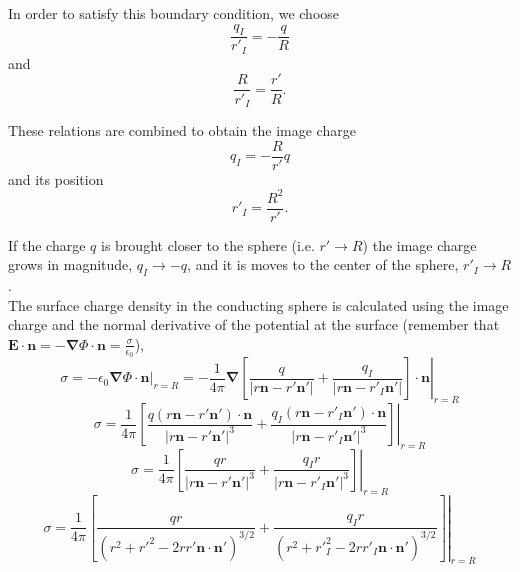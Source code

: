 In order to satisfy this boundary condition, we choose
\begin{equation}
\frac{q_I}{r'_I} = -\frac{q}{R} 
\end{equation}
and
\begin{equation}
\frac{R}{r'_I} = \frac{r'}{R}.
\end{equation}

These relations are combined to obtain the image charge
\begin{equation}
 q_I = -\frac{R}{r'} q \label{ImageCharge01}
 \end{equation}
and its position
\begin{equation}
r'_I = \frac{R^2}{r'}.  \label{ImageChargePosition01}
\end{equation}

If the charge $q$ is brought closer to the sphere (i.e. $r' \rightarrow R$) the image charge grows in magnitude, $q_I \rightarrow -q$, and it is moves to the center of the sphere, $r'_I \rightarrow R$. \\
The surface charge density in the conducting sphere is calculated using the image charge and the normal derivative of the potential at the surface (remember that $ \textbf{E}  \cdot \textbf{n}= -\boldsymbol{\nabla} \Phi \cdot \textbf{n} = \frac{\sigma}{\epsilon_0}$),
\begin{equation}
 \sigma = -\epsilon_0 \left. \boldsymbol{\nabla} \Phi \cdot \textbf{n}  \right|_{r=R} = - \frac{1}{4 \pi } \left. \boldsymbol{\nabla} \left[  \frac{q}{\left| r \textbf{n} - r' \textbf{n}' \right|} + \frac{q_I}{\left| r \textbf{n} - r'_I \textbf{n}' \right|} \right] \cdot \textbf{n}  \right|_{r=R}   
 \end{equation} 
\begin{equation}
 \sigma =  \frac{1}{4 \pi } \left. \left[  \frac{q (r \textbf{n} - r' \textbf{n}' ) \cdot \textbf{n} }{\left| r \textbf{n} - r' \textbf{n}' \right|^3 } + \frac{q_I (r \textbf{n} - r'_I \textbf{n}')\cdot \textbf{n} }{\left| r \textbf{n} - r'_I \textbf{n}' \right|^3} \right]  \right|_{r=R}   
 \end{equation} 
\begin{equation}
 \sigma =  \frac{1}{4 \pi } \left. \left[  \frac{q r }{\left| r \textbf{n} - r' \textbf{n}' \right|^3 } + \frac{q_I r }{\left| r \textbf{n} - r'_I \textbf{n}' \right|^3} \right]  \right|_{r=R}   
 \end{equation} 
\begin{equation}
 \sigma =  \frac{1}{4 \pi } \left. \left[  \frac{q r }{\left(r^2 + r'^2 - 2 rr' \textbf{n} \cdot \textbf{n}' \right)^{3/2} } + \frac{q_I r }{\left(r^2 + r'^2_I - 2 rr'_I \textbf{n} \cdot \textbf{n}' \right)^{3/2}} \right]  \right|_{r=R}   
 \end{equation} 
